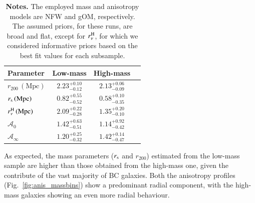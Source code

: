 \documentclass{aa}
\begin{document}
\begin{table}
\centering
\caption{Best fit parameters for low-mass and high-mass galaxies.}
\renewcommand{\arraystretch}{1.3}
\begin{tabular}{lccc}
\hline
{Parameter} & {Low-mass} & {High-mass}  \\
\hline
       
       $r_{200} \, (\mathrm{Mpc})$ & $2.23_{-0.12}^{+0.10}$ & $2.13_{-0.09}^{+0.06}$  \\
       $r_{\rm s} \, (\mathrm{Mpc})$ & $0.82_{-0.52}^{+0.55}$ & $0.58_{-0.35}^{+0.10}$ \\
       $r_\nu^{\rm H} \, (\mathrm{Mpc})$ & $2.09_{-0.28}^{+0.22}$ & $1.35_{-0.10}^{+0.20}$  \\
       $\mathcal{A}_0$ & 
       $1.42_{-0.51}^{+0.63}$ & $1.14_{-0.42}^{+0.92}$  \\
       $\mathcal{A}_\infty$ & $1.20_{-0.32}^{+0.25}$ & $1.42_{-0.47}^{+0.14}$  \\
          
\hline
\end{tabular}
\caption*{\footnotesize \textbf{Notes.} The employed mass and anisotropy models are NFW and gOM, respectively. The assumed priors, for these runs, are broad and flat, except for $r_\nu^{\rm H}$, for which we considered informative priors based on the best fit values for each subsample.}
\label{tab:massbins_results}
\end{table}


As expected, the mass parameters ($r_{\rm s}$ and $r_{200}$) estimated from the low-mass sample are higher than those obtained from the high-mass one, given the contribute of the vast majority of BC galaxies. Both the anisotropy profiles (Fig.~\ref{fig:anis_massbins}) show a predominant radial component, with the high-mass galaxies showing an even more radial behaviour.
\end{document}
